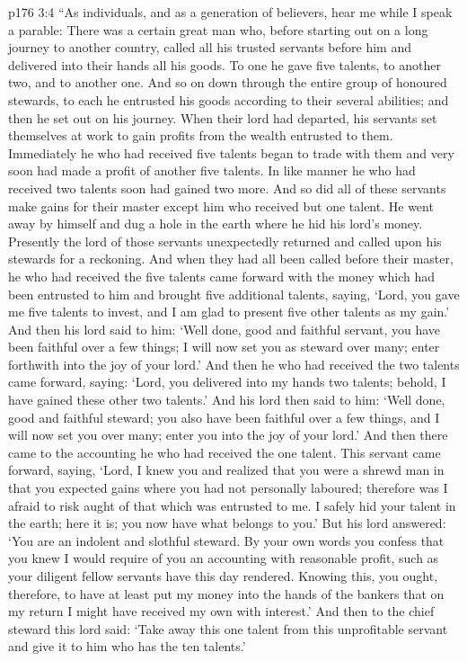 \vs p176 3:4 “As individuals, and as a generation of believers, hear me while I speak a parable: There was a certain great man who, before starting out on a long journey to another country, called all his trusted servants before him and delivered into their hands all his goods. To one he gave five talents, to another two, and to another one. And so on down through the entire group of honoured stewards, to each he entrusted his goods according to their several abilities; and then he set out on his journey. When their lord had departed, his servants set themselves at work to gain profits from the wealth entrusted to them. Immediately he who had received five talents began to trade with them and very soon had made a profit of another five talents. In like manner he who had received two talents soon had gained two more. And so did all of these servants make gains for their master except him who received but one talent. He went away by himself and dug a hole in the earth where he hid his lord’s money. Presently the lord of those servants unexpectedly returned and called upon his stewards for a reckoning. And when they had all been called before their master, he who had received the five talents came forward with the money which had been entrusted to him and brought five additional talents, saying, ‘Lord, you gave me five talents to invest, and I am glad to present five other talents as my gain.’ And then his lord said to him: ‘Well done, good and faithful servant, you have been faithful over a few things; I will now set you as steward over many; enter forthwith into the joy of your lord.’ And then he who had received the two talents came forward, saying: ‘Lord, you delivered into my hands two talents; behold, I have gained these other two talents.’ And his lord then said to him: ‘Well done, good and faithful steward; you also have been faithful over a few things, and I will now set you over many; enter you into the joy of your lord.’ And then there came to the accounting he who had received the one talent. This servant came forward, saying, ‘Lord, I knew you and realized that you were a shrewd man in that you expected gains where you had not personally laboured; therefore was I afraid to risk aught of that which was entrusted to me. I safely hid your talent in the earth; here it is; you now have what belongs to you.’ But his lord answered: ‘You are an indolent and slothful steward. By your own words you confess that you knew I would require of you an accounting with reasonable profit, such as your diligent fellow servants have this day rendered. Knowing this, you ought, therefore, to have at least put my money into the hands of the bankers that on my return I might have received my own with interest.’ And then to the chief steward this lord said: ‘Take away this one talent from this unprofitable servant and give it to him who has the ten talents.’
